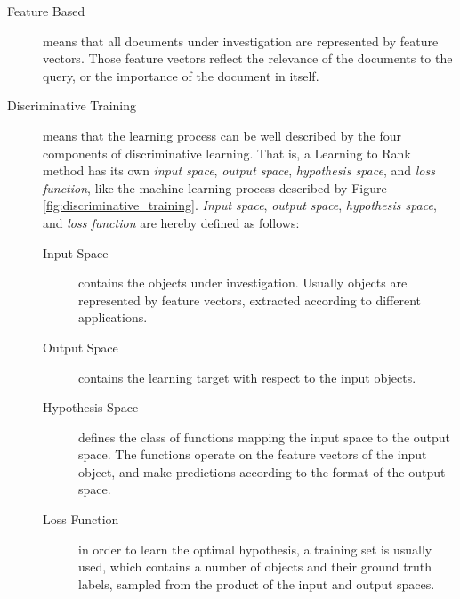 \begin{description}
\item[Feature Based]{means that all documents under investigation are represented by feature vectors. Those feature vectors reflect the relevance of the documents to the query, or the importance of the document in itself.}
\item[Discriminative Training]{means that the learning process can be well described by the four components of discriminative learning. That is, a Learning to Rank method has its own \emph{input space}, \emph{output space}, \emph{hypothesis space}, and \emph{loss function}, like the machine learning process described by Figure \ref{fig:discriminative_training}. \emph{Input space}, \emph{output space}, \emph{hypothesis space}, and \emph{loss function} are hereby defined as follows:
	\begin{description}
	\item[Input Space]{contains the objects under investigation. Usually objects are represented by feature vectors, extracted according to different applications.}
	\item[Output Space]{contains the learning target with respect to the input objects.}
	\item[Hypothesis Space]{defines the class of functions mapping the input space to the output space. The functions operate on the feature vectors of the input object, and make predictions according to the format of the output space.}
	\item[Loss Function]{in order to learn the optimal hypothesis, a training set is usually used, which contains a number of objects and their ground truth labels, sampled from the product of the input and output spaces.}
	\end{description}
	}
\end{description}


